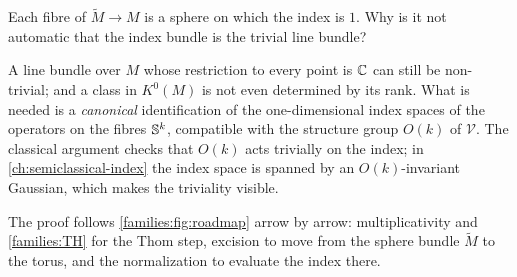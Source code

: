 \begin{question}
  Each fibre of $\tilde M\to M$ is a sphere on which the index is $1$. Why is it
  not automatic that the index bundle is the trivial line bundle?
\end{question}
\begin{answer}
  A line bundle over $M$ whose restriction to every point is $\mathbb{C}$ can still be
  non-trivial; and a class in $K^0(M)$ is not even determined by its rank. What
  is needed is a \emph{canonical} identification of the one-dimensional index
  spaces of the operators on the fibres $\mathbb{S}^k$, compatible with the
  structure group $O(k)$ of $\mathcal V$. The classical argument checks that
  $O(k)$ acts trivially on the index; in \cref{ch:semiclassical-index} the index
  space is spanned by an $O(k)$-invariant Gaussian, which makes the triviality
  visible.
\end{answer}

The proof follows \cref{families:fig:roadmap} arrow by arrow: multiplicativity
and \ref{families:TH} for the Thom step, excision to move from the sphere bundle
$\tilde M$ to the torus, and the normalization to evaluate the index there.

